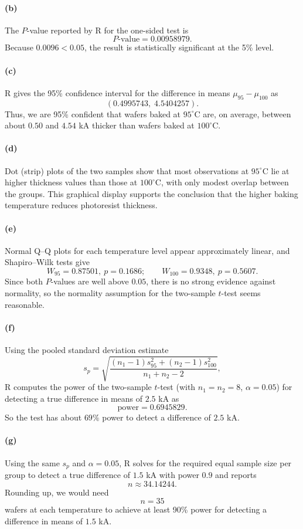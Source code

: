 \documentclass[answers,12pt,addpoints]{exam}
\begin{document}
\begin{questions}
\begin{solution}
\paragraph{(b)}
The $P$-value reported by R for the one-sided test is
\[
P\text{-value} = 0.00958979.
\]
Because $0.0096 < 0.05$, the result is statistically significant at the 5\% level.

\paragraph{(c)}
R gives the 95\% confidence interval for the difference in means $\mu_{95} - \mu_{100}$ as
\[
(0.4995743,\; 4.5404257).
\]
Thus, we are 95\% confident that wafers baked at $95^\circ$C are, on average, between about $0.50$ and $4.54$ kA thicker than wafers baked at $100^\circ$C.

\paragraph{(d)}
Dot (strip) plots of the two samples show that most observations at $95^\circ$C lie at higher thickness values than those at $100^\circ$C, with only modest overlap between the groups. This graphical display supports the conclusion that the higher baking temperature reduces photoresist thickness.

\paragraph{(e)}
Normal Q--Q plots for each temperature level appear approximately linear, and Shapiro--Wilk tests give
\[
W_{95} = 0.87501,\ p = 0.1686;\qquad
W_{100} = 0.9348,\ p = 0.5607.
\]
Since both $P$-values are well above $0.05$, there is no strong evidence against normality, so the normality assumption for the two-sample $t$-test seems reasonable.

\paragraph{(f)}
Using the pooled standard deviation estimate
\[
s_p = \sqrt{\frac{(n_1-1)s_{95}^2 + (n_2-1)s_{100}^2}{n_1+n_2-2}},
\]
R computes the power of the two-sample $t$-test (with $n_1 = n_2 = 8$, $\alpha = 0.05$) for detecting a true difference in means of $2.5$ kA as
\[
\text{power} = 0.6945829.
\]
So the test has about $69\%$ power to detect a difference of $2.5$ kA.

\paragraph{(g)}
Using the same $s_p$ and $\alpha = 0.05$, R solves for the required equal sample size per group to detect a true difference of $1.5$ kA with power $0.9$ and reports
\[
n \approx 34.14244.
\]
Rounding up, we would need
\[
n = 35
\]
wafers at each temperature to achieve at least 90\% power for detecting a difference in means of $1.5$ kA.


\end{solution}
\end{questions}
\end{document}
